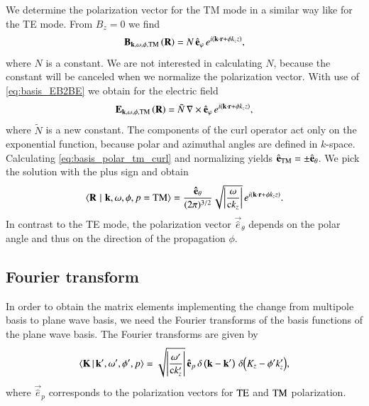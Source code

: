 We determine the polarization vector for the TM mode in a similar way like for
the TE mode. From $B_z=0$ we find
\begin{equation}
{\mathbf{B}}_{{\mathbf{k}}, \omega, \phi, \text{TM}}\left({\mathbf{R}}\right) = N \, \hat{{\mathbf{e}}}_\varphi \, e^{i ({\mathbf{k}} \cdot {\mathbf{r}} + \phi k_z z)},
\end{equation}
where $N$ is a constant. We are not interested in calculating $N$, because the constant
will be canceled when we normalize the polarization vector.
With use of \eqref{eq:basis_EB2BE} we obtain for the electric field
\begin{equation}
\label{eq:basis_polar_tm_curl}
{\mathbf{E}}_{{\mathbf{k}}, \omega, \phi, \text{TM}}\left({\mathbf{R}}\right) = \tilde N \, \nabla \times \hat{{\mathbf{e}}}_\varphi \, e^{i ({\mathbf{k}} \cdot {\mathbf{r}} + \phi k_z z)},
\end{equation}
where $\tilde N$ is a new constant. The components of the curl operator act only on the
exponential function, because polar and azimuthal angles are defined in $k$-space.
Calculating \eqref{eq:basis_polar_tm_curl} and normalizing yields
$\hat{{\mathbf{e}}}_{\mathrm{TM}} = \pm \hat{{\mathbf{e}}}_\theta$. We pick the solution
with the plus sign and obtain
\begin{equation}
\Braket{{\mathbf{R}} \, | \, {\mathbf{k}}, \omega, \phi, p=\mathrm{TM}}
= \frac{{\mathbf{\hat e}}_\theta}{(2\pi)^{3/2}} \sqrt{\left|\frac{\omega}{\mathrm{c} k_z}\right|} \, e^{i ({\mathbf{k}}\cdot{\mathbf{r}} + \phi k_z z)}.
\end{equation}
In contrast to the TE mode, the polarization vector $\vec{\hat e}_\theta$
depends on the polar angle and thus on the direction of the propagation $\phi$.


\subsection{Fourier transform}

In order to obtain the matrix elements implementing the change from multipole
basis to plane wave basis, we need the Fourier transforms of the basis functions of
the plane wave basis. The Fourier transforms are given by
\begin{equation}
\braket{{\mathbf{K}} \, | \, {\mathbf{k}}^\prime,\omega^\prime,\phi^\prime,p} = \sqrt{\left|\frac{\omega^\prime}{\mathrm{c} k_z^\prime}\right|} \, {\mathbf{\hat e}}_p \, \delta\left({\mathbf{k}}-{\mathbf{k}}^\prime\right) \, \delta{\left(K_z - \phi^\prime k_z^\prime\right)},
\end{equation}
where $\vec{\hat e}_p$ corresponds to the polarization vectors for $\mathrm{TE}$ and $\mathrm{TM}$
polarization.


